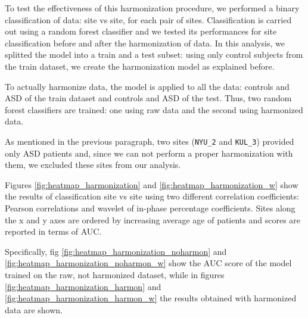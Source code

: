\documentclass[11pt]{report}
\begin{document}
To test the effectiveness of this harmonization procedure, we performed a binary classification of data: site vs site, for each pair of sites.
Classification is carried out using a random forest classifier and we tested its performances for site classification before and after the harmonization of data.
In this analysis, we splitted the model into a train and a test subset: using only control subjects from the train dataset, we create the harmonization model as explained before.

To actually harmonize data, the model is applied to all the data: controls and ASD of the train dataset and controls and ASD of the test.
Thus, two random forest classifiers are trained: one using raw data and the second using harmonized data.


As mentioned in the previous paragraph, two sites (\texttt{NYU\_2} and \texttt{KUL\_3}) provided only ASD patients and, since we can not perform a proper harmonization with them, we excluded these sites from our analysis.

Figures \ref{fig:heatmap_harmonization} and \ref{fig:heatmap_harmonization_w} show the results of classification site vs site using two different correlation coefficients: Pearson correlations and wavelet of in-phase percentage coefficients.
Sites along the x and y axes are ordered by increasing average age of patients and scores are reported in terms of AUC.

Specifically, fig \ref{fig:heatmap_harmonization_noharmon} and \ref{fig:heatmap_harmonization_noharmon_w} show the AUC score of the model trained on the raw, not harmonized dataset, while in figures \ref{fig:heatmap_harmonization_harmon} and \ref{fig:heatmap_harmonization_harmon_w} the results obtained with harmonized data are shown.
\end{document}
